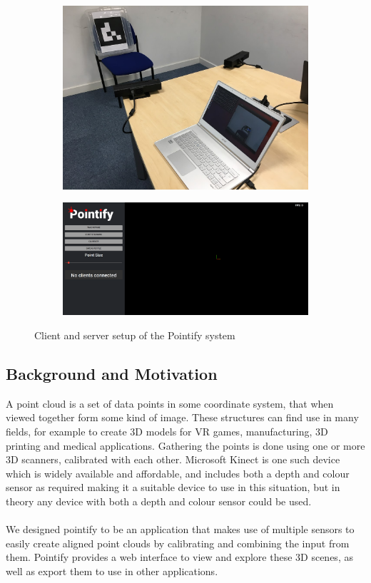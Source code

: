\documentclass{article}
\begin{document}
\begin{figure}[h]
\centering
\begin{subfigure}[b]{0.49\textwidth}
  \centering
  \includegraphics[scale=0.175]{pointifysetup}
\end{subfigure}
\begin{subfigure}[b]{0.49\textwidth}
  \centering
  \includegraphics[scale=0.125]{pointifyserver}
\end{subfigure}
\caption{Client and server setup of the Pointify system}
\label{fig:pointifydemo}
\end{figure}

\subsection{Background and Motivation}
A point cloud is a set of data points in some coordinate system, that when viewed together form some kind of image. These structures can find use in many fields,
for example to create 3D models for VR games, manufacturing, 3D printing and medical applications. Gathering the points is done using one or more 3D scanners, calibrated with each other. Microsoft Kinect is one such device which is widely available and affordable, and includes both a depth and colour sensor as required making it a suitable device to use in this situation, but in theory any device with both a depth and colour sensor could be used.
\\\\
We designed pointify to be an application that makes use of multiple sensors to easily create aligned point clouds by calibrating and combining the input from them. Pointify provides a web interface to view and explore these 3D scenes, as well as export them to use in other applications.
\end{document}
